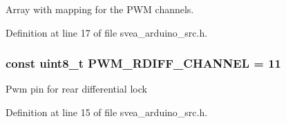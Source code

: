 Array with mapping for the P\+WM channels. 



Definition at line 17 of file svea\+\_\+arduino\+\_\+src.\+h.

\subsubsection[{\texorpdfstring{P\+W\+M\+\_\+\+R\+D\+I\+F\+F\+\_\+\+C\+H\+A\+N\+N\+EL}{PWM_RDIFF_CHANNEL}}]{\setlength{\rightskip}{0pt plus 5cm}const uint8\+\_\+t P\+W\+M\+\_\+\+R\+D\+I\+F\+F\+\_\+\+C\+H\+A\+N\+N\+EL = 11}\hypertarget{group__PwmOutputChannels_ga2e4d0ce85dd092067453618a88db0ac6}{}\label{group__PwmOutputChannels_ga2e4d0ce85dd092067453618a88db0ac6}
Pwm pin for rear differential lock 

Definition at line 15 of file svea\+\_\+arduino\+\_\+src.\+h.

